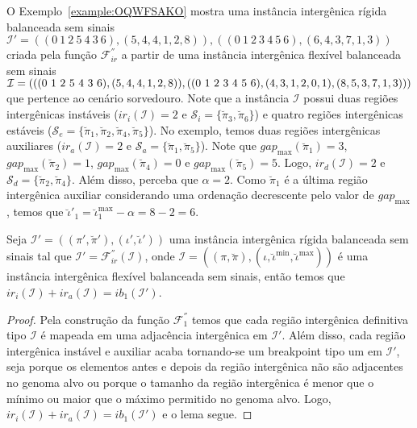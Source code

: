O Exemplo~\ref{example:OQWFSAKO} mostra uma instância intergênica rígida balanceada sem sinais $\mathcal{I}' = ((0~1~2~5~4~3~6),(5,4,4,1,2,8)),((0~1~2~3~4~5~6),(6,4,3,7,1,3))$ criada pela função $\mathcal{F}_{ir}^{''}$ a partir de uma instância intergênica flexível balanceada sem sinais $\mathcal{I} = (((0~1~2~5~4~3~6),(5,4,4,\break1,2,8)),((0~1~2~3~4~5~6),(4,3,1,2,0,1),(8,5,3,7,1,3)))$ que pertence ao cenário sorvedouro. Note que a instância $\mathcal{I}$ possui duas regiões intergênicas instáveis ($ir_i(\mathcal{I}) = 2$ e $\mathcal{S}_{i}=\{\breve\pi_3,\breve\pi_6\}$) e quatro regiões intergênicas estáveis ($\mathcal{S}_{e}=\{\breve\pi_1,\breve\pi_2,\breve\pi_4,\breve\pi_5\}$). No exemplo, temos duas regiões intergênicas auxiliares ($ir_a(\mathcal{I}) = 2$ e $\mathcal{S}_{a}=\{\breve\pi_1,\breve\pi_5\}$). Note que $gap_{\max}(\breve\pi_1) = 3$, $gap_{\max}(\breve\pi_2) = 1$, $gap_{\max}(\breve\pi_4) = 0$ e $gap_{\max}(\breve\pi_5) = 5$. Logo, $ir_d(\mathcal{I}) = 2$ e $\mathcal{S}_{d}=\{\breve\pi_2,\breve\pi_4\}$. Além disso, perceba que $\alpha = 2$. Como $\breve\pi_1$ é a última região intergênica auxiliar considerando uma ordenação decrescente pelo valor de $gap_{\max}$, temos que $\breve\iota'_1 = \breve\iota^{\max}_1 -\alpha = 8 - 2 = 6$.



\begin{lemma}\label{lemma:KPGCUTDM}
Seja $\mathcal{I'} = ((\pi',\breve\pi'),(\iota',\breve\iota'))$ uma instância intergênica rígida balanceada sem sinais tal que $\mathcal{I'} = \mathcal{F}_{ir}^{''}(\mathcal{I})$, onde $\mathcal{I} = ((\pi,\breve\pi),(\iota,\breve\iota^{\min},\breve\iota^{\max}))$ é uma instância intergênica flexível balanceada sem sinais, então temos que $ir_i(\mathcal{I}) + ir_a(\mathcal{I}) = ib_1(\mathcal{I'})$.
\end{lemma}
\begin{proof}
Pela construção da função $\mathcal{F}_{1}^{''}$ temos que cada região intergênica definitiva tipo $\mathcal{I}$ é mapeada em uma adjacência intergênica em $\mathcal{I'}$. Além disso, cada região intergênica instável e auxiliar acaba tornando-se um breakpoint tipo um em $\mathcal{I'}$, seja porque os elementos antes e depois da região intergênica não são adjacentes no genoma alvo ou porque o tamanho da região intergênica é menor que o mínimo ou maior que o máximo permitido no genoma alvo. Logo, $ir_i(\mathcal{I}) + ir_a(\mathcal{I}) = ib_1(\mathcal{I'})$ e o lema segue.
\end{proof}

